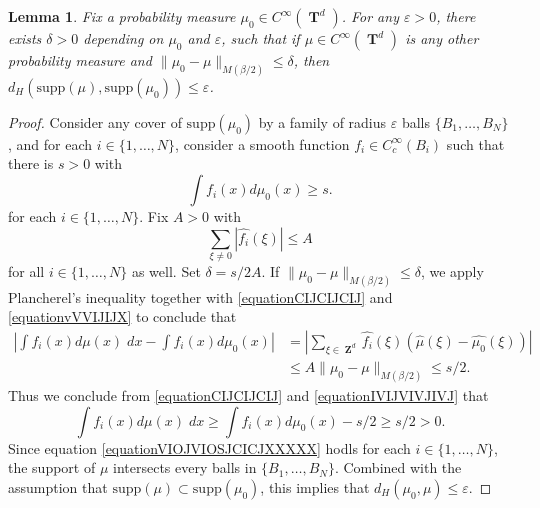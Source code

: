 \documentclass[12pt,reqno]{article}
\numberwithin{equation}{section}
\DeclareMathOperator{\ZZ}{\mathbf{Z}}
\DeclareMathOperator{\TT}{\mathbf{T}}
\newtheorem{lemma}{Lemma}
\begin{document}
\begin{lemma} \label{LemmaTAOIAWOIDJ12301}
    Fix a probability measure $\mu_0 \in C^\infty(\TT^d)$. For any $\varepsilon > 0$, there exists $\delta > 0$ depending on $\mu_0$ and $\varepsilon$, such that if $\mu \in C^\infty(\TT^d)$ is any other probability measure and $\| \mu_0 - \mu \|_{M(\beta/2)} \leq \delta$, then $d_H(\text{supp}(\mu),\text{supp}(\mu_0)) \leq \varepsilon$.
\end{lemma}
\begin{proof}
    Consider any cover of $\text{supp}(\mu_0)$ by a family of radius $\varepsilon$ balls $\{ B_1,\dots,B_N \}$, and for each $i \in \{ 1, \dots, N \}$, consider a smooth function $f_i \in C_c^\infty(B_i)$ such that there is $s > 0$ with
    \begin{equation} \label{equationCIJCIJCIJ}
        \int f_i(x) d\mu_0(x) \geq s.
    \end{equation}
    for each $i \in \{ 1, \dots, N \}$. Fix $A > 0$ with
    \begin{equation} \label{equationvVVIJIJX}
        \sum_{\xi \neq 0} |\widehat{f_i}(\xi)| \leq A
    \end{equation}
    for all $i \in \{ 1, \dots, N \}$ as well. Set $\delta = s/2A$. If $\| \mu_0 - \mu \|_{M(\beta/2)} \leq \delta$, we apply Plancherel's inequality together with \eqref{equationCIJCIJCIJ} and \eqref{equationvVVIJIJX} to conclude that
    \begin{equation} \label{equationIVIJVIVJIVJ}
    \begin{split}
        \left| \int f_i(x) d\mu(x)\; dx - \int f_i(x) d\mu_0(x) \right| &= \left| \sum_{\xi \in \ZZ^d} \widehat{f_i}(\xi) \left( \widehat{\mu}(\xi) - \widehat{\mu_0}(\xi) \right) \right|\\
        &\leq A \| \mu_0 - \mu \|_{M(\beta/2)} \leq s/2.
    \end{split}
    \end{equation}
    Thus we conclude from \eqref{equationCIJCIJCIJ} and \eqref{equationIVIJVIVJIVJ} that
    \begin{equation} \label{equationVIOJVIOSJCICJXXXXX}
        \int f_i(x) d\mu(x)\; dx \geq \int f_i(x) d\mu_0(x) - s/2 \geq s/2 > 0.
    \end{equation}
    Since equation \eqref{equationVIOJVIOSJCICJXXXXX} hodls for each $i \in \{ 1,\dots, N \}$, the support of $\mu$ intersects every balls in $\{ B_1, \dots, B_N \}$. Combined with the assumption that $\text{supp}(\mu) \subset \text{supp}(\mu_0)$, this implies that $d_H(\mu_0,\mu) \leq \varepsilon$.
\end{proof}
\end{document}
